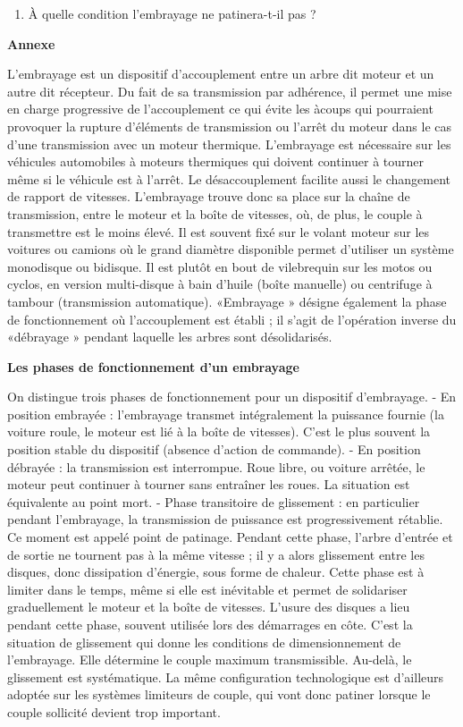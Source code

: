 \begin{enumerate}[resume]
\item À quelle condition l'embrayage ne patinera-t-il pas ?
\end{enumerate}

\begin{center}
\large{\textbf{Annexe}}
\end{center}

L'embrayage est un dispositif d'accouplement entre un arbre dit moteur et un autre dit récepteur. Du fait de sa transmission par adhérence, il permet une mise en charge progressive de l'accouplement ce qui évite les àcoups qui pourraient provoquer la rupture d'éléments de transmission ou l'arrêt du moteur dans le cas d'une transmission avec un moteur thermique.
L'embrayage est nécessaire sur les véhicules automobiles à moteurs thermiques qui doivent continuer à tourner même si le véhicule est à l'arrêt. Le désaccouplement facilite aussi le changement de rapport de vitesses. L'embrayage trouve donc sa place sur la chaîne de transmission, entre le moteur et la boîte de vitesses, où, de plus, le couple à transmettre est le moins élevé. Il est souvent fixé sur le volant moteur sur les voitures ou camions où le grand diamètre disponible permet d'utiliser un système monodisque ou bidisque. Il est plutôt en bout de vilebrequin sur les motos ou cyclos, en version multi-disque à bain d'huile (boîte manuelle) ou centrifuge à tambour (transmission automatique).
«Embrayage » désigne également la phase de fonctionnement où l'accouplement est établi ; il s'agit de l'opération inverse du «débrayage » pendant laquelle les arbres sont désolidarisés.

\textbf{Les phases de fonctionnement d'un embrayage}

On distingue trois phases de fonctionnement pour un dispositif d'embrayage.
- En position embrayée : l'embrayage transmet intégralement la puissance fournie (la voiture roule, le moteur est lié à la boîte de vitesses). C'est le plus souvent la position stable du dispositif (absence d'action de commande).
- En position débrayée : la transmission est interrompue. Roue libre, ou voiture arrêtée, le moteur peut continuer à tourner sans entraîner les roues. La situation est équivalente au point mort.
- Phase transitoire de glissement : en particulier pendant l'embrayage, la transmission de puissance est progressivement rétablie. Ce moment est appelé point de patinage. Pendant cette phase, l'arbre d'entrée et de sortie ne tournent pas à la même vitesse ; il y a alors glissement entre les disques, donc dissipation d'énergie, sous forme de chaleur. Cette phase est à limiter dans le temps, même si elle est inévitable et permet de solidariser graduellement le moteur et la boîte de vitesses. L'usure des disques a lieu pendant cette phase, souvent utilisée lors des démarrages en côte.
C'est la situation de glissement qui donne les conditions de dimensionnement de l'embrayage. Elle détermine le couple maximum transmissible. Au-delà, le glissement est systématique. La même configuration technologique est d'ailleurs adoptée sur les systèmes limiteurs de couple, qui vont donc patiner lorsque le couple sollicité devient trop important.

